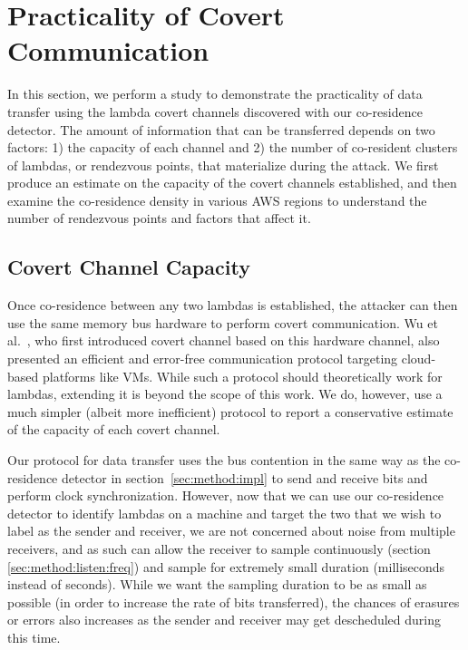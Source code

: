 \section{Practicality of Covert Communication}
\label{sec:study}

In this section, we perform a study to demonstrate the practicality of data
transfer using the lambda covert channels discovered with our co-residence
detector.  The amount of information that can be transferred depends on two
factors: 1) the capacity of each channel and 2) the number of co-resident
clusters of lambdas, or rendezvous points, that materialize during the attack.
We first produce an estimate on the capacity of the covert channels established,
and then examine the co-residence density in various AWS regions to understand
the number of rendezvous points and factors that affect it.

\subsection{Covert Channel Capacity}

Once co-residence between any two lambdas is established, the attacker can then
use the same memory bus hardware to perform covert communication. Wu et
al.~\cite{wuusenix2012}, who first introduced covert channel based on this
hardware channel, also presented an efficient and error-free communication
protocol targeting cloud-based platforms like VMs.  While such a protocol should
theoretically work for lambdas, extending it is beyond the scope of this work.
We do, however, use a much simpler (albeit more inefficient) protocol to report
a conservative estimate of the capacity of each covert channel.

Our protocol for data transfer uses the bus contention in the same way as the
co-residence detector in section~\ref{sec:method:impl} to send and receive bits
and perform clock synchronization. However, now that we can use our co-residence
detector to identify lambdas on a machine and target the two that we wish to
label as the sender and receiver, we are not concerned about noise from multiple
receivers, and as such can allow the receiver to sample continuously (section
\ref{sec:method:listen:freq}) and sample for extremely small duration
(milliseconds instead of seconds). While we want the sampling duration to be as
small as possible (in order to increase the rate of bits transferred), the
chances of erasures or errors also increases as the sender and receiver may get
descheduled during this time. 

